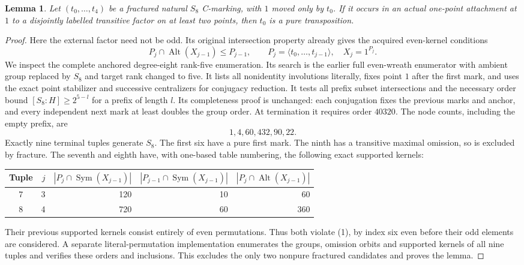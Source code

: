 \documentclass[11pt,a4paper]{article}
\newtheorem{lemma}{Lemma}\newtheorem{theorem}[lemma]{Theorem}
\newcommand{\gen}[1]{\langle#1\rangle}
\newcommand{\Sym}{\operatorname{Sym}}
\newcommand{\Alt}{\operatorname{Alt}}
\begin{document}
\begin{lemma}\label{eight}
Let $(t_0,\ldots,t_4)$ be a fractured natural $S_8$ C-marking,
with $1$ moved only by $t_0$. If it occurs in an actual one-point
attachment at $1$ to a disjointly labelled transitive factor
on at least two points, then
$t_0$ is a pure transposition.
\end{lemma}
\begin{proof}
Here the external factor need not be odd. Its original intersection
property already gives the acquired even-kernel conditions
\[
 P_j\cap\Alt(X_{j-1})\le P_{j-1},\qquad
 P_j=\gen{t_0,\ldots,t_{j-1}},\quad X_j=1^{P_j}.
                                                               \tag{1}
\]
We inspect the complete anchored degree-eight rank-five enumeration.
Its search is the earlier full even-wreath enumerator with ambient
group replaced by $S_8$ and target rank changed to five. It lists
all nonidentity involutions literally, fixes point $1$ after the
first mark, and uses the exact point stabilizer and successive
centralizers for conjugacy reduction. It tests all prefix subset
intersections and the necessary order bound
$[S_8:H]\ge2^{5-l}$ for a prefix of length $l$.
Its completeness proof is unchanged: each conjugation fixes the
previous marks and anchor, and every independent next mark at
least doubles the group order. At termination it requires order
$40320$. The node counts, including the empty prefix, are
\[
                    1,4,60,432,90,22.
\]
Exactly nine terminal tuples generate $S_8$. The first six have
a pure first mark. The ninth has a transitive maximal omission,
so is excluded by fracture. The seventh and eighth have, with
one-based table numbering, the following exact supported kernels:
\begin{center}
\begin{tabular}{crrrr}\toprule
Tuple&$j$&$|P_j\cap\Sym(X_{j-1})|$
 &$|P_{j-1}\cap\Sym(X_{j-1})|$
 &$|P_j\cap\Alt(X_{j-1})|$\\\midrule
7&3&120&10&60\\
8&4&720&60&360\\\bottomrule
\end{tabular}
\end{center}
Their previous supported kernels consist entirely of even permutations.
Thus both violate (1), by index six even before their odd elements
are considered. A separate literal-permutation implementation
enumerates the groups, omission orbits and supported kernels of all
nine tuples and verifies these orders and inclusions. This excludes
the only two nonpure fractured candidates and proves the lemma.
\end{proof}
\end{document}
